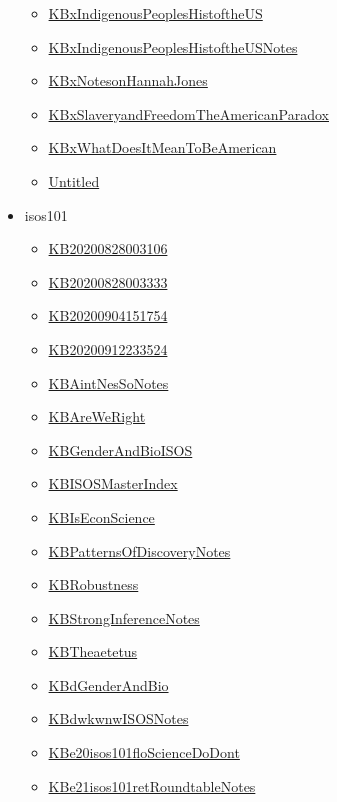 \documentclass[11pt]{article}
\begin{document}
\begin{itemize}
\begin{itemize}
\item \href{hist301/KBxIndigenousPeoplesHistoftheUS.org}{KBxIndigenousPeoplesHistoftheUS}
\item \href{hist301/KBxIndigenousPeoplesHistoftheUSNotes.org}{KBxIndigenousPeoplesHistoftheUSNotes}
\item \href{hist301/KBxNotesonHannahJones.org}{KBxNotesonHannahJones}
\item \href{hist301/KBxSlaveryandFreedomTheAmericanParadox.org}{KBxSlaveryandFreedomTheAmericanParadox}
\item \href{hist301/KBxWhatDoesItMeanToBeAmerican.org}{KBxWhatDoesItMeanToBeAmerican}
\item \href{hist301/Untitled.org}{Untitled}
\end{itemize}
\item isos101
\begin{itemize}
\item \href{isos101/KB20200828003106.org}{KB20200828003106}
\item \href{isos101/KB20200828003333.org}{KB20200828003333}
\item \href{isos101/KB20200904151754.org}{KB20200904151754}
\item \href{isos101/KB20200912233524.org}{KB20200912233524}
\item \href{isos101/KBAintNesSoNotes.org}{KBAintNesSoNotes}
\item \href{isos101/KBAreWeRight.org}{KBAreWeRight}
\item \href{isos101/KBGenderAndBioISOS.org}{KBGenderAndBioISOS}
\item \href{isos101/KBISOSMasterIndex.org}{KBISOSMasterIndex}
\item \href{isos101/KBIsEconScience.org}{KBIsEconScience}
\item \href{isos101/KBPatternsOfDiscoveryNotes.org}{KBPatternsOfDiscoveryNotes}
\item \href{isos101/KBRobustness.org}{KBRobustness}
\item \href{isos101/KBStrongInferenceNotes.org}{KBStrongInferenceNotes}
\item \href{isos101/KBTheaetetus.org}{KBTheaetetus}
\item \href{isos101/KBdGenderAndBio.org}{KBdGenderAndBio}
\item \href{isos101/KBdwkwnwISOSNotes.org}{KBdwkwnwISOSNotes}
\item \href{isos101/KBe20isos101floScienceDoDont.org}{KBe20isos101floScienceDoDont}
\item \href{isos101/KBe21isos101retRoundtableNotes.org}{KBe21isos101retRoundtableNotes}

\end{itemize}
\end{itemize}
\end{document}
